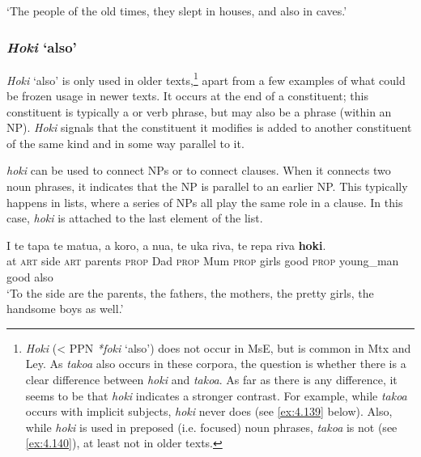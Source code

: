 \glt 
‘The people of the old times, they slept in houses, and also in caves.’ \textstyleExampleref{[Ley-5-02.001]}\textstyleExampleref{} 
\z {}
\subsubsection{\textit{Hoki} ‘also’}\label{sec:4.5.3.3}

\textit{Hoki} ‘also’ is only used in older texts,\footnote{\label{fn:196}\textit{Hoki} ({\textless} PPN \textit{*foki} ‘also’) does not occur in MsE, but is common in Mtx and Ley. As \textit{tako{\ꞌ}a} also occurs in these corpora, the question is whether there is a clear difference between \textit{hoki} and \textit{tako{\ꞌ}a}. As far as there is any difference, it seems to be that \textit{hoki} indicates a stronger contrast. For example, while \textit{tako{\ꞌ}a} occurs with implicit subjects, \textit{hoki} never does (see \ref{ex:4.139} below). Also, while \textit{hoki} is used in preposed (i.e. focused) noun phrases, \textit{tako{\ꞌ}a} is not (see \ref{ex:4.140}), at least not in older texts.} apart from a few examples of what could be frozen usage in newer texts. It occurs at the end of a constituent; this constituent is typically a  or verb phrase, but may also be a  phrase (within an NP). \textit{Hoki} signals that the constituent it modifies is added to another constituent of the same kind and in some way parallel to it. 

\textit{hoki} can be used to connect NPs or to connect clauses. When it connects two noun phrases, it indicates that the NP is parallel to an earlier NP. This typically happens in lists, where a series of NPs all play the same role in a clause. In this case, \textit{hoki} is attached to the last element of the list. 

\ea\label{ex:4.138}
\gll {\ꞌ}I te tapa te matu{\ꞌ}a, a koro, a nua, te uka riva, te repa  riva \textbf{hoki}.\\
at \textsc{art} side \textsc{art} parents \textsc{prop} Dad \textsc{prop} Mum \textsc{prop} girls good \textsc{prop} young\_man  good also\\

\glt
‘To the side are the parents, the fathers, the mothers, the pretty girls, the handsome boys as well.’ \textstyleExampleref{[Ley-5-24.013]}
\z

